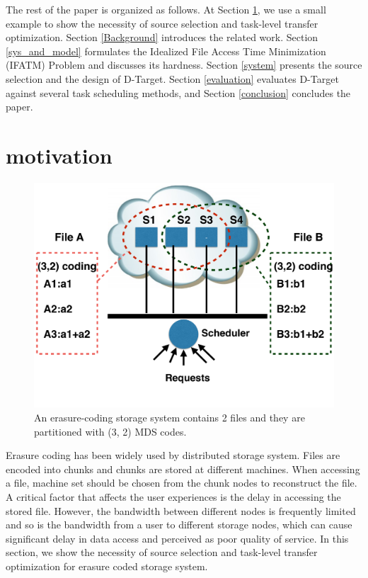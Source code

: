 \documentclass{IEEEtran}
\begin{document}
The rest of the paper is organized as follows. At Section \ref{motivation}, we use a small example to show the necessity of source selection and task-level transfer optimization.
Section \ref{Background} introduces the related work. 
Section \ref{sys_and_model} formulates the Idealized File Access Time Minimization (IFATM) Problem and discusses its hardness. 
Section \ref{system} presents the source selection and the design of D-Target.  
Section \ref{evaluation} evaluates D-Target against several task scheduling methods, and Section \ref{conclusion} concludes the paper.




\section{motivation} \label{motivation}

\begin{figure}[b]
\begin{center}
\includegraphics [width=0.7\columnwidth] {./picture/motivation/motivation.pdf}
\caption{An erasure-coding storage system contains 2 files and they are partitioned with (3, 2) MDS codes.}
\label{online-offline-fig}
\end{center}
\end{figure}

Erasure coding has been widely used by distributed storage system.
Files are encoded into chunks and chunks are stored at different machines.
When accessing a file, machine set should be chosen from the chunk nodes to reconstruct the file.
A critical factor that affects the user experiences is the delay in accessing the stored file. 
However, the bandwidth between different nodes is frequently limited and so is the bandwidth from a user to different storage nodes, which can cause significant delay in data access and perceived as poor quality of service.
In this section, we show the necessity of source selection and task-level transfer optimization for erasure coded storage system. 
\end{document}
